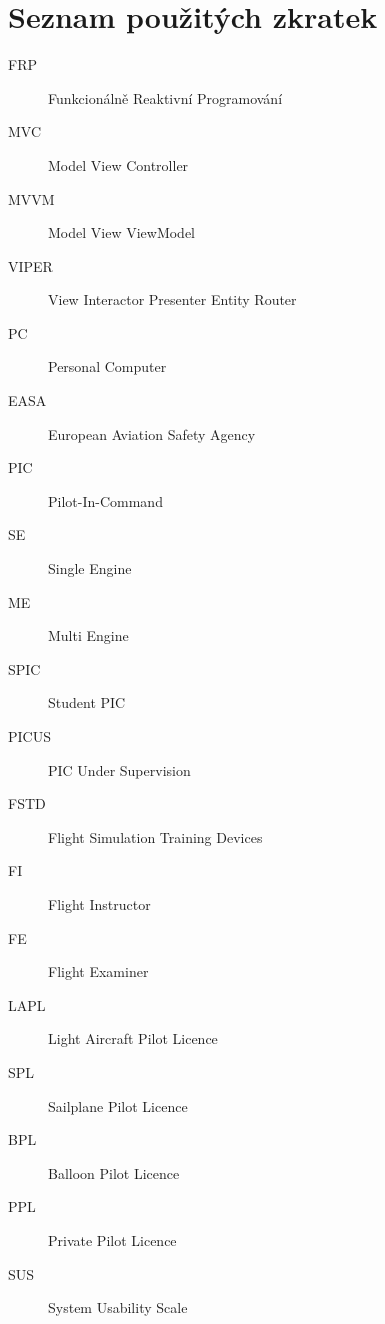\documentclass[thesis=M,czech]{FITthesis}[2012/06/26]
\begin{document}
\chapter{Seznam použitých zkratek}
\begin{description}
	\item[FRP] Funkcionálně Reaktivní Programování
	\item[MVC] Model View Controller
	\item[MVVM] Model View ViewModel
	\item[VIPER] View Interactor Presenter Entity Router
	\item[PC] Personal Computer
	\item[EASA] European Aviation Safety Agency
	\item[PIC] Pilot-In-Command
	\item[SE] Single Engine
	\item[ME] Multi Engine
	\item[SPIC] Student PIC
	\item[PICUS] PIC Under Supervision
	\item[FSTD] Flight Simulation Training Devices
	\item[FI] Flight Instructor
	\item[FE] Flight Examiner
	\item[LAPL] Light Aircraft Pilot Licence
	\item[SPL] Sailplane Pilot Licence
	\item[BPL] Balloon Pilot Licence
	\item[PPL] Private Pilot Licence
	\item[SUS] System Usability Scale
\end{description}
\end{document}
